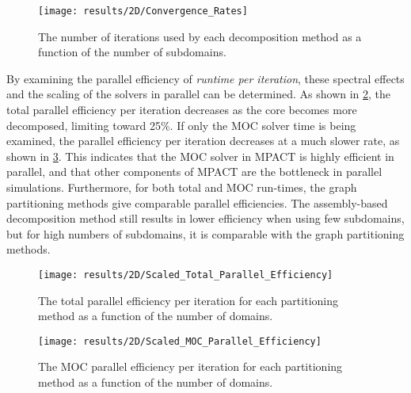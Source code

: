{{{{        \begin{figure}
          \centering
          \texttt{[image: results/2D/Convergence\_Rates]}
          \caption{The number of iterations used by each decomposition method as a function of the number of subdomains. \label{fig:Spatial Decomposition:Convergence}}
        \end{figure}

        By examining the parallel efficiency of \emph{runtime per iteration}, these spectral effects and the scaling of the solvers in parallel can be determined.
        As shown in \cref{fig:Spatial Decomposition:Scaled Parallel Efficiency}, the total parallel efficiency per iteration decreases as the core becomes more decomposed, limiting toward 25\%.
        If only the \ac{MOC} solver time is being examined, the parallel efficiency per iteration decreases at a much slower rate, as shown in \cref{fig:Spatial Decomposition:Scaled MOC Parallel Efficiency}.
        This indicates that the \ac{MOC} solver in MPACT is highly efficient in parallel, and that other components of MPACT are the bottleneck in parallel simulations.
        Furthermore, for both total and \ac{MOC} run-times, the graph partitioning methods give comparable parallel efficiencies.
        The assembly-based decomposition method still results in lower efficiency when using few subdomains, but for high numbers of subdomains, it is comparable with the graph partitioning methods.

        \begin{figure}
          \centering
          \texttt{[image: results/2D/Scaled\_Total\_Parallel\_Efficiency]}
          \caption{The total parallel efficiency per iteration for each partitioning method as a function of the number of domains. \label{fig:Spatial Decomposition:Scaled Parallel Efficiency}}
        \end{figure}

        \begin{figure}
          \centering
          \texttt{[image: results/2D/Scaled\_MOC\_Parallel\_Efficiency]}
          \caption{The \ac{MOC} parallel efficiency per iteration for each partitioning method as a function of the number of domains. \label{fig:Spatial Decomposition:Scaled MOC Parallel Efficiency}}
        \end{figure}

}}}}
